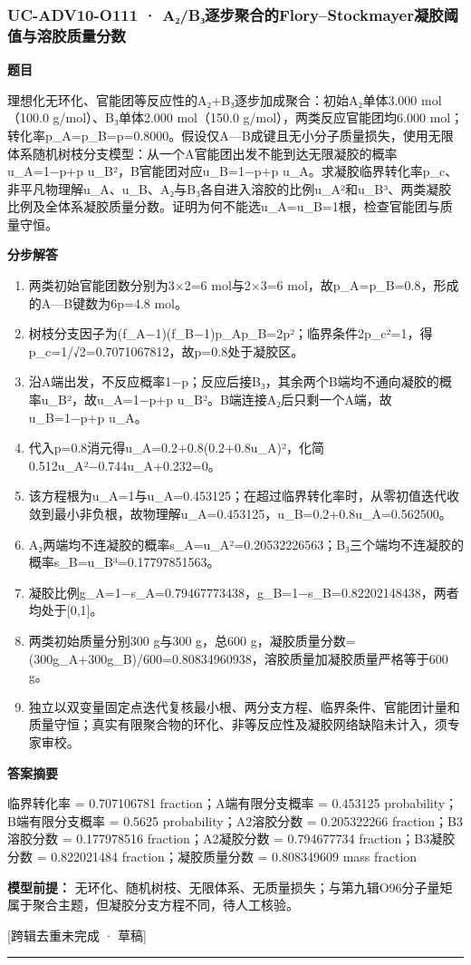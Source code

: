 \documentclass[UTF8,11pt,a4paper]{ctexart}
\begin{document}
\subsubsection*{UC-ADV10-O111 · A₂/B₃逐步聚合的Flory–Stockmayer凝胶阈值与溶胶质量分数}
\noindent\textbf{题目}\par
理想化无环化、官能团等反应性的A₂+B₃逐步加成聚合：初始A₂单体3.000 mol（100.0 g/mol）、B₃单体2.000 mol（150.0 g/mol），两类反应官能团均6.000 mol；转化率p\_A=p\_B=p=0.8000。假设仅A—B成键且无小分子质量损失，使用无限体系随机树枝分支模型：从一个A官能团出发不能到达无限凝胶的概率u\_A=1−p+p u\_B²，B官能团对应u\_B=1−p+p u\_A。求凝胶临界转化率p\_c、非平凡物理解u\_A、u\_B、A₂与B₃各自进入溶胶的比例u\_A²和u\_B³、两类凝胶比例及全体系凝胶质量分数。证明为何不能选u\_A=u\_B=1根，检查官能团与质量守恒。\par
\medskip\noindent\textbf{分步解答}
\begin{enumerate}
\item 两类初始官能团数分别为3×2=6 mol与2×3=6 mol，故p\_A=p\_B=0.8，形成的A—B键数为6p=4.8 mol。
\item 树枝分支因子为(f\_A−1)(f\_B−1)p\_Ap\_B=2p²；临界条件2p\_c²=1，得p\_c=1/√2=0.7071067812，故p=0.8处于凝胶区。
\item 沿A端出发，不反应概率1−p；反应后接B₃，其余两个B端均不通向凝胶的概率u\_B²，故u\_A=1−p+p u\_B²。B端连接A₂后只剩一个A端，故u\_B=1−p+p u\_A。
\item 代入p=0.8消元得u\_A=0.2+0.8(0.2+0.8u\_A)²，化简0.512u\_A²−0.744u\_A+0.232=0。
\item 该方程根为u\_A=1与u\_A=0.453125；在超过临界转化率时，从零初值迭代收敛到最小非负根，故物理解u\_A=0.453125，u\_B=0.2+0.8u\_A=0.562500。
\item A₂两端均不连凝胶的概率s\_A=u\_A²=0.20532226563；B₃三个端均不连凝胶的概率s\_B=u\_B³=0.17797851563。
\item 凝胶比例g\_A=1−s\_A=0.79467773438，g\_B=1−s\_B=0.82202148438，两者均处于[0,1]。
\item 两类初始质量分别300 g与300 g，总600 g，凝胶质量分数=(300g\_A+300g\_B)/600=0.80834960938，溶胶质量加凝胶质量严格等于600 g。
\item 独立以双变量固定点迭代复核最小根、两分支方程、临界条件、官能团计量和质量守恒；真实有限聚合物的环化、非等反应性及凝胶网络缺陷未计入，须专家审校。
\end{enumerate}
\noindent\textbf{答案摘要}\par
临界转化率 = 0.707106781 fraction；A端有限分支概率 = 0.453125 probability；B端有限分支概率 = 0.5625 probability；A2溶胶分数 = 0.205322266 fraction；B3溶胶分数 = 0.177978516 fraction；A2凝胶分数 = 0.794677734 fraction；B3凝胶分数 = 0.822021484 fraction；凝胶质量分数 = 0.808349609 mass fraction\par
\noindent\textbf{模型前提：}
无环化、随机树枝、无限体系、无质量损失；与第九辑O96分子量矩属于聚合主题，但凝胶分支方程不同，待人工核验。\par
\noindent\textcolor{red!65!black}{[跨辑去重未完成 · 草稿]} \par
\medskip\hrule\medskip
{}
\end{document}
